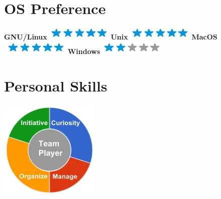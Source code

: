 \documentclass[]{friggeri-cv}
\begin{document}
\begin{aside}
  \section{OS Preference}
    \textbf{GNU/Linux}\includegraphics[scale=0.40]{img/5stars.png}
    \textbf{Unix}\includegraphics[scale=0.40]{img/5stars.png}
    \textbf{MacOS}\includegraphics[scale=0.40]{img/5stars.png}
    \textbf{Windows}\includegraphics[scale=0.40]{img/2stars.png}
    ~
  \section{Personal Skills}
    \includegraphics[scale=0.62]{img/personal.png}
    ~
\end{aside}
\end{document}
